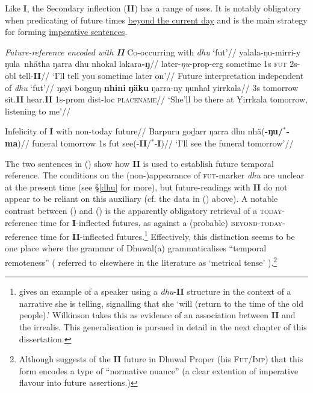Like \textbf{I}, the Secondary inflection (\textbf{II}) has a range of uses. It is notably obligatory when predicating of future times \underline{beyond the current day} and is the main strategy for forming \underline{imperative sentences}.

\pex{} \textit{Future-reference encoded with \textbf{II}}
\a{}\begingl\glpreamble Co-occurring with \textit{dhu} `\gls{fut}'//
\gla yalala-ŋu-mirri-y ŋula~nhätha ŋarra dhu nhokal lakara\textbf{-ŋ}//
\glb later-\textit{ŋu}-\gls{prop}-\gls{erg} sometime 1s \textsc{fut} 2s-\gls{obl} tell-\textbf{II}//
\glft`I'll tell you sometime later on'//
\endgl
\a{}\begingl\glpreamble Future interpretation independent of \textit{dhu} `\gls{fut}'//
\gla ŋayi boŋguŋ \textbf{nhini} \textbf{ŋäku} ŋarra-ny ŋunhal yirrkala//
\glb 3s tomorrow sit.\textbf{II} hear.\textbf{II} 1s-\gls{prom} \gls{dist}-\gls{loc} \textsc{placename}//
\glft`She'll be there at Yirrkala tomorrow, listening to me'//\endgl

\a\begingl\glpreamble Infelicity of \textbf{I} with non-today future//
\gla Barpuru goḏarr ŋarra dhu nhä(\textbf{-ŋu/$^*$-ma})//
\glb funeral tomorrow 1s \gls{fut} see(-\textbf{II}/$^*$-\textbf{I})//
\glft `I'll see the funeral tomorrow'\trailingcitation{[AW~20180730]}//\endgl

\xe

The two sentences in () show how \textbf{II} is used to establish future temporal reference. The conditions on the (non-)appearance of \textsc{fut}-marker \textit{dhu} are unclear at the present time (see §\ref{dhu} for more), but future-readings with \textbf{II} do not appear to be reliant on this auxiliary (cf. the data in () above). A notable contrast between () and () is the apparently obligatory retrieval of a \textsc{today}-reference time for \textbf{I}-inflected futures, as against a (probable) \textsc{beyond-today}-reference time for \textbf{II}-inflected futures.\footnote{\citet[347]{Wilkinson1991} gives an example of a speaker using a \textit{dhu}-\textbf{II} structure in the context of a narrative she is telling, signalling that she `will (return to the time of the old people).' Wilkinson takes this as evidence of an association between \textbf{II} and the irrealis. This generalisation is pursued in detail in the next chapter of this dissertation.} Effectively, this distinction seems to be one place where the grammar of Dhuwal(a) grammaticalises ``temporal remoteness'' (\citet{Comrie1985,Dahl1985} referred to elsewhere in the literature as `metrical tense' \citealp[e.g.][204]{Chung}).\footnote{Although \citet[39]{Heath1980} suggests of the \textbf{II} future in Dhuwal Proper (his \textsc{Fut/Imp}) that this form encodes a type of ``normative nuance'' (a clear extention of imperative flavour into future assertions.)}


